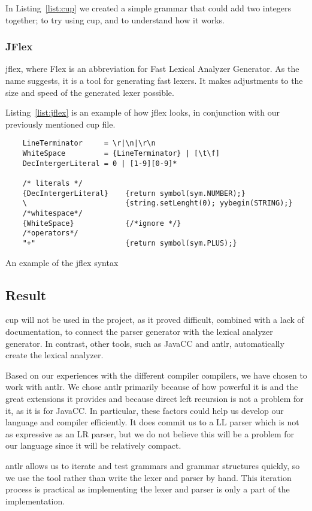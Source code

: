 In Listing~\ref{list:cup} we created a simple grammar that could add two integers together; to try using \gls{cup}, and to understand how it works.


\subsubsection{JFlex}
\gls{jflex}, where Flex is an abbreviation for Fast Lexical Analyzer Generator. As the name suggests, it is a tool for generating fast lexers. It makes adjustments to the size and speed of the generated lexer possible.

Listing~\ref{list:jflex} is an example of how \gls{jflex} looks, in conjunction with our previously mentioned \gls{cup} file.


\begin{listing}[htb!]
  \centering
  \begin{verbatim}
    LineTerminator     = \r|\n|\r\n
    WhiteSpace         = {LineTerminator} | [\t\f]
    DecIntergerLiteral = 0 | [1-9][0-9]*

    /* literals */
    {DecIntergerLiteral}    {return symbol(sym.NUMBER);}
    \                       {string.setLenght(0); yybegin(STRING);}
    /*whitespace*/ 
    {WhiteSpace}            {/*ignore */}  
    /*operators*/
    "+"                     {return symbol(sym.PLUS);}
  \end{verbatim}
  \caption{An example of the \gls{jflex} syntax}
  \label{list:jflex}
\end{listing}


\subsection{Result}
\gls{cup} will not be used in the project, as it proved difficult, combined with a lack of documentation, to connect the parser generator with the lexical analyzer generator. In contrast, other tools, such as JavaCC and \gls{antlr}, automatically create the lexical analyzer.

Based on our experiences with the different compiler compilers, we have chosen to work with \gls{antlr}. We chose \gls{antlr} primarily because of how powerful it is and the great extensions it provides and because direct left recursion is not a problem for it, as it is for JavaCC. In particular, these factors could help us develop our language and compiler efficiently. It does commit us to a LL parser which is not as expressive as an LR parser, but we do not believe this will be a problem for our language since it will be relatively compact.

\gls{antlr} allows us to iterate and test grammars and grammar structures quickly, so we use the tool rather than write the lexer and parser by hand. This iteration process is practical as implementing the lexer and parser is only a part of the implementation.